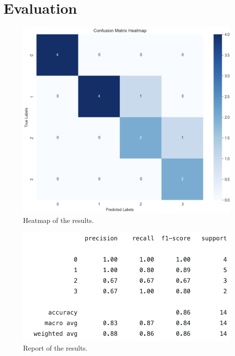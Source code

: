 \section{Evaluation}
\begin{figure}[H]
    \centering
    \includegraphics[scale=0.38]{src/images/heatmap_results.png}
    \caption{Heatmap of the results.}
    \label{fig:heatmapresults}
\end{figure}

\begin{figure}[H]
    \centering
    \hspace{-1.4cm}  
    \includegraphics[scale=0.55]{src/images/class_report_result.png}
    \caption{Report of the results.}
    \label{fig:reportresults}
\end{figure}